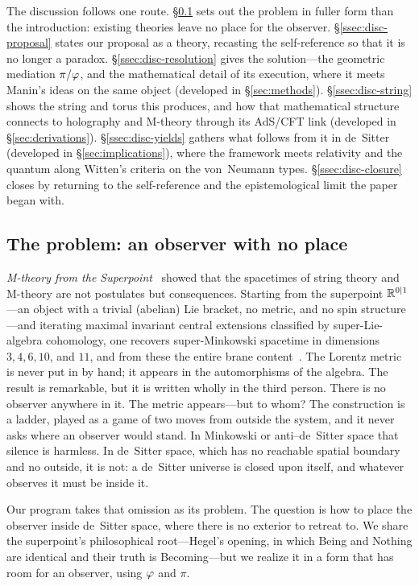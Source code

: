 The discussion follows one route. \S\ref{ssec:disc-problem} sets out the problem in fuller form than the introduction: existing theories leave no place for the observer. \S\ref{ssec:disc-proposal} states our proposal as a theory, recasting the self-reference so that it is no longer a paradox. \S\ref{ssec:disc-resolution} gives the solution---the geometric mediation $\pi/\varphi$, and the mathematical detail of its execution, where it meets Manin's ideas on the same object (developed in \S\ref{sec:methods}). \S\ref{ssec:disc-string} shows the string and torus this produces, and how that mathematical structure connects to holography and M-theory through its AdS/CFT link (developed in \S\ref{sec:derivations}). \S\ref{ssec:disc-yields} gathers what follows from it in de~Sitter (developed in \S\ref{sec:implications}), where the framework meets relativity and the quantum along Witten's criteria on the von~Neumann types. \S\ref{ssec:disc-closure} closes by returning to the self-reference and the epistemological limit the paper began with.

\subsection{The problem: an observer with no place}\label{ssec:disc-problem}

\emph{M-theory from the Superpoint}~\cite{huerta2018m,Huerta2019emerge} showed that the spacetimes of string theory and M-theory are not postulates but consequences. Starting from the superpoint $\mathbb{R}^{0|1}$---an object with a trivial (abelian) Lie bracket, no metric, and no spin structure---and iterating maximal invariant central extensions classified by super-Lie-algebra cohomology, one recovers super-Minkowski spacetime in dimensions $3,4,6,10$, and $11$, and from these the entire brane content~\cite{FiorenzaSatiSchreiber15}. The Lorentz metric is never put in by hand; it appears in the automorphisms of the algebra. The result is remarkable, but it is written wholly in the third person. There is no observer anywhere in it. The metric appears---but to whom? The construction is a ladder, played as a game of two moves from outside the system, and it never asks where an observer would stand. In Minkowski or anti--de~Sitter space that silence is harmless. In de~Sitter space, which has no reachable spatial boundary and no outside, it is not: a de~Sitter universe is closed upon itself, and whatever observes it must be inside it.

Our program takes that omission as its problem. The question is how to place the observer inside de~Sitter space, where there is no exterior to retreat to. We share the superpoint's philosophical root---Hegel's opening, in which Being and Nothing are identical and their truth is Becoming---but we realize it in a form that has room for an observer, using $\varphi$ and $\pi$.

